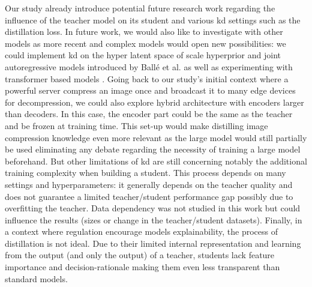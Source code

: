 Our study already introduce potential future research work regarding the influence of the teacher model on its student and various \acrshort{kd} settings such as the distillation loss. In future work, we would also like to investigate  with other  models as more recent and complex models would open new possibilities: we could implement \acrshort{kd} on the hyper latent space of scale hyperprior and joint autoregressive models introduced by Ballé et al. \cite{ballé2018variationalimagecompressionscale, minnen2018jointautoregressivehierarchicalpriors} as well as experimenting with transformer based models \cite{zou2022devildetailswindowbasedattention}. Going back to our study's initial context where a powerful server compress an image once and broadcast it to many edge devices for decompression, we could also explore hybrid architecture with encoders larger than decoders. In this case, the encoder part could be the same as the teacher and be frozen at training time. This set-up would make distilling image compression knowledge even more relevant as the large model would still partially be used eliminating any debate regarding the necessity of training a large model beforehand. But other limitations of \acrshort{kd} are still concerning notably the additional training complexity when building a student. This process depends on many settings and hyperparameters: it generally depends on the teacher quality and does not guarantee a limited teacher/student performance gap possibly due to overfitting the teacher. Data dependency was not studied in this work but could influence the results (sizes or change in the teacher/student datasets). Finally, in a context where regulation encourage models explainability, the process of distillation is not ideal. Due to their limited internal representation and learning from the output (and only the output) of a teacher, students lack feature importance and decision-rationale making them even less transparent than standard models.
